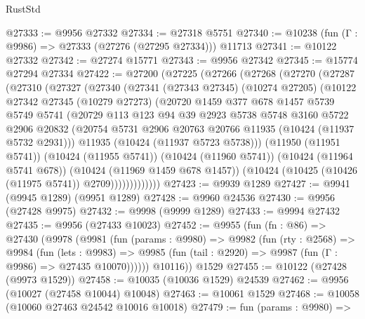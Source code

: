 \begin{lexlean}{RustStd}
\begin{coremodule}
@27333 := @9956 @27332
@27334 := @27318 @5751
@27340 := @10238 (fun (Γ : @9986) => @27333 (@27276 (@27295 @27334))) @11713
@27341 := @10122 @27332
@27342 := @27274 @15771
@27343 := @9956 @27342
@27345 := @15774 @27294 @27334
@27422 := @27200
    (@27225
      (@27266
        (@27268
          (@27270
            (@27287
              (@27310
                (@27327
                  (@27340
                    (@27341
                      (@27343 @27345)
                      (@10274 @27205)
                      (@10122
                        @27342
                        @27345
                        (@10279 @27273)
                        (@20720
                          @1459
                          @377
                          @678
                          @1457
                          @5739
                          @5749
                          @5741
                          (@20729
                            @113
                            @123
                            @94
                            @39
                            @2923
                            @5738
                            @5748
                            @3160
                            @5722
                            @2906
                            @20832
                            (@20754 @5731 @2906 @20763 @20766 @11935 (@10424 (@11937 @5732 @2931)))
                            @11935
                            (@10424 (@11937 @5723 @5738)))
                          (@11950 (@11951 @5741))
                          (@10424 (@11955 @5741))
                          (@10424 (@11960 @5741))
                          (@10424 (@11964 @5741 @678))
                          (@10424 (@11969 @1459 @678 @1457))
                          (@10424 (@10425 (@10426 (@11975 @5741)) @2709)))))))))))))
@27423 := @9939 @1289
@27427 := @9941 (@9945 @1289) (@9951 @1289)
@27428 := @9960 @24536
@27430 := @9956 (@27428 @9975)
@27432 := @9998 (@9999 @1289)
@27433 := @9994 @27432
@27435 := @9956 (@27433 @10023)
@27452 := @9955
    (fun (fn : @86) =>
    @27430
      (@9978
        (@9981
          (fun (params : @9980) =>
          @9982
            (fun (rty : @2568) =>
            @9984
              (fun (lets : @9983) =>
              @9985 (fun (tail : @2920) => @9987 (fun (Γ : @9986) => @27435 @10070))))))
        @10116))
    @1529
@27455 := @10122 (@27428 (@9973 @1529))
@27458 := @10035 (@10036 @1529) @24539
@27462 := @9956 (@10027 (@27458 @10044) @10048)
@27463 := @10061 @1529
@27468 := @10058 (@10060 @27463 @24542 @10016 @10018)
@27479 := fun (params : @9980) =>

\end{coremodule}
\end{lexlean}
